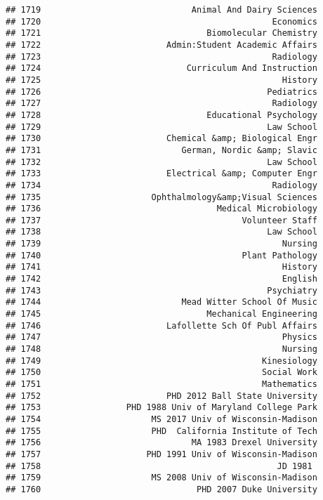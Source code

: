 \documentclass[
]{article}
\begin{document}
\begin{verbatim}
## 1719                              Animal And Dairy Sciences
## 1720                                              Economics
## 1721                                 Biomolecular Chemistry
## 1722                         Admin:Student Academic Affairs
## 1723                                              Radiology
## 1724                             Curriculum And Instruction
## 1725                                                History
## 1726                                             Pediatrics
## 1727                                              Radiology
## 1728                                 Educational Psychology
## 1729                                             Law School
## 1730                         Chemical &amp; Biological Engr
## 1731                            German, Nordic &amp; Slavic
## 1732                                             Law School
## 1733                         Electrical &amp; Computer Engr
## 1734                                              Radiology
## 1735                      Ophthalmology&amp;Visual Sciences
## 1736                                   Medical Microbiology
## 1737                                        Volunteer Staff
## 1738                                             Law School
## 1739                                                Nursing
## 1740                                        Plant Pathology
## 1741                                                History
## 1742                                                English
## 1743                                             Psychiatry
## 1744                            Mead Witter School Of Music
## 1745                                 Mechanical Engineering
## 1746                         Lafollette Sch Of Publ Affairs
## 1747                                                Physics
## 1748                                                Nursing
## 1749                                            Kinesiology
## 1750                                            Social Work
## 1751                                            Mathematics
## 1752                         PHD 2012 Ball State University
## 1753                 PHD 1988 Univ of Maryland College Park
## 1754                      MS 2017 Univ of Wisconsin-Madison
## 1755                      PHD  California Institute of Tech
## 1756                              MA 1983 Drexel University
## 1757                     PHD 1991 Univ of Wisconsin-Madison
## 1758                                               JD 1981 
## 1759                      MS 2008 Univ of Wisconsin-Madison
## 1760                               PHD 2007 Duke University

\end{verbatim}
\end{document}
